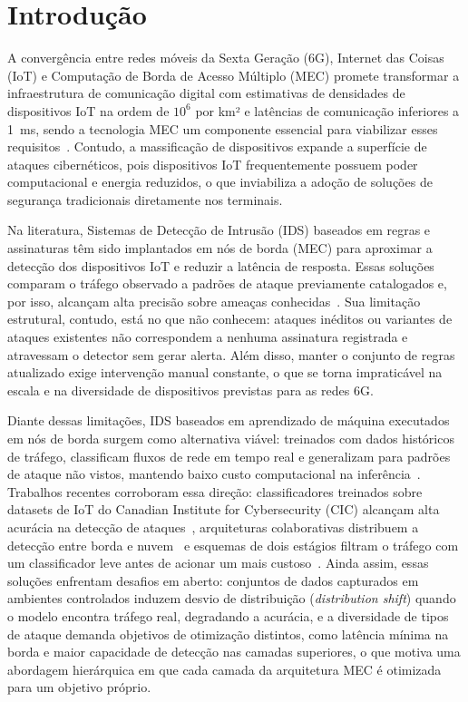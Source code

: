 \documentclass[12pt]{article}
\begin{document}
\section{Introdução}

A convergência entre redes móveis da Sexta Geração (6G), Internet das Coisas (IoT) e Computação de Borda de Acesso Múltiplo (MEC) promete transformar a infraestrutura
de comunicação digital com estimativas de densidades de dispositivos IoT na
ordem de $10^6$ por km² e latências de comunicação inferiores a 1~ms, sendo a tecnologia MEC um componente essencial para viabilizar esses requisitos~\cite{you:21}. Contudo,
a massificação de dispositivos expande a superfície de ataques cibernéticos, pois dispositivos IoT frequentemente possuem poder computacional e energia reduzidos, o que inviabiliza a adoção de soluções de segurança tradicionais diretamente nos terminais.

Na literatura, Sistemas de Detecção de Intrusão (IDS) baseados em regras e
assinaturas têm sido implantados em nós de borda (MEC) para aproximar a detecção
dos dispositivos IoT e reduzir a latência de resposta. Essas soluções comparam o
tráfego observado a padrões de ataque previamente catalogados e, por isso,
alcançam alta precisão sobre ameaças conhecidas~\cite{lazarevic:05}. Sua
limitação estrutural, contudo, está no que não conhecem: ataques inéditos ou
variantes de ataques existentes não correspondem a nenhuma assinatura registrada
e atravessam o detector sem gerar alerta. Além disso, manter o conjunto de
regras atualizado exige intervenção manual constante, o que se torna
impraticável na escala e na diversidade de dispositivos previstas para as redes
6G.

Diante dessas limitações, IDS baseados em aprendizado de máquina executados em
nós de borda surgem como alternativa viável: treinados com dados históricos de
tráfego, classificam fluxos de rede em tempo real e generalizam para padrões de
ataque não vistos, mantendo baixo custo computacional na
inferência~\cite{gyamfi:22}. Trabalhos recentes corroboram essa direção:
classificadores treinados sobre datasets de IoT do Canadian Institute for
Cybersecurity (CIC) alcançam alta acurácia na detecção de
ataques~\cite{houichi:25,chen:24}, arquiteturas colaborativas distribuem a
detecção entre borda e nuvem~\cite{yang:23} e esquemas de dois estágios filtram
o tráfego com um classificador leve antes de acionar um mais
custoso~\cite{aldaej:24}. Ainda assim, essas soluções enfrentam desafios em
aberto: conjuntos de dados capturados em ambientes controlados induzem desvio de
distribuição (\textit{distribution shift}) quando o modelo encontra tráfego
real, degradando a acurácia, e a diversidade de tipos de ataque demanda
objetivos de otimização distintos, como latência mínima na borda e maior
capacidade de detecção nas camadas superiores, o que motiva uma abordagem
hierárquica em que cada camada da arquitetura MEC é otimizada para um objetivo
próprio.
\end{document}
